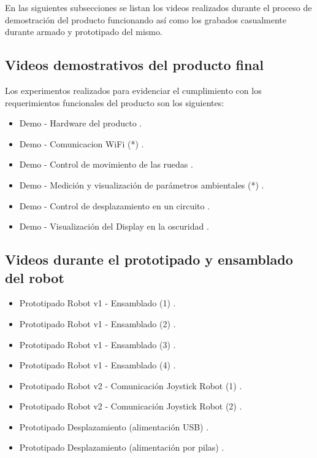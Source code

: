 En las siguientes subsecciones se listan los videos realizados durante el proceso de demostración del producto funcionando así como los grabados casualmente durante armado y prototipado del mismo.


\subsection{Videos demostrativos del producto final}

Los experimentos realizados para evidenciar el cumplimiento con los requerimientos funcionales del producto son los siguientes:
\begin{itemize}
	\item Demo - Hardware del producto \cite{Demo_Hardware}.
	\item Demo - Comunicacion WiFi (*) \cite{Demo_ComWifi}.
	\item Demo - Control de movimiento de las ruedas \cite{Demo_Control_Movimiento_1}.
	\item Demo - Medición y visualización de parámetros ambientales (*) \cite{Demo_Mediciones}.
	\item Demo - Control de desplazamiento en un circuito \cite{Demo_Control_Movimiento_2}.
	\item Demo - Visualización del Display en la oscuridad \cite{Demo_Display_Oscuridad}.
	
\end{itemize}


\subsection{Videos durante el prototipado y ensamblado del robot}

\begin{itemize}
	\item Prototipado Robot v1 - Ensamblado  (1) \cite{Prototipado_Ensamblado_1}.	
	\item Prototipado Robot v1 - Ensamblado  (2) \cite{Prototipado_Ensamblado_2}.
	\item Prototipado Robot v1 - Ensamblado  (3) \cite{Prototipado_Ensamblado_3}.
	\item Prototipado Robot v1 - Ensamblado  (4) \cite{Prototipado_Ensamblado_4}.
	\item Prototipado Robot v2 - Comunicación Joystick Robot (1) \cite{Prototipado_Comunicacion_JoystickRobot1}.
	\item Prototipado Robot v2 - Comunicación Joystick Robot (2) \cite{Prototipado_Comunicacion_JoystickRobot2}.
	\item Prototipado Desplazamiento (alimentación USB) \cite{Prototipado_Desplazamiento_USB}.
	\item Prototipado Desplazamiento (alimentación por pilas) \cite{Prototipado_Desplazamiento_Pilas}.

\end{itemize}


